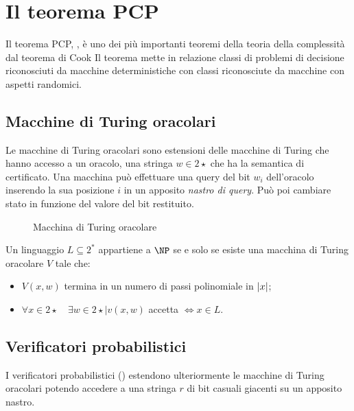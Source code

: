 


\section{Il teorema PCP}
Il teorema PCP, , è uno dei più importanti teoremi della teoria della complessità dal teorema di Cook
Il teorema mette in relazione classi di problemi di decisione riconosciuti da macchine deterministiche con classi riconosciute da macchine con aspetti randomici.


\subsection{Macchine di Turing oracolari}
Le macchine di Turing oracolari sono estensioni delle macchine di Turing che hanno accesso a un oracolo, una stringa $w\in 2\star$ che ha la semantica di certificato.
Una macchina può effettuare una query del bit $w_i$ dell'oracolo inserendo la sua posizione $i$ in un apposito \emph{nastro di query}.
Può poi cambiare stato in funzione del valore del bit restituito.

\begin{figure}[ht]
	\centering
	
	\caption{Macchina di Turing oracolare}
	\label{fig:mdtoracle}
\end{figure}

\begin{defin}
	Un linguaggio $L\subseteq 2^*$ appartiene a $\NP$ se e solo se esiste una macchina di Turing oracolare $V$ tale che:
	\begin{itemize}
		\item $V(x,w)$ termina in un numero di passi polinomiale in $|x|$;
		\item $\forall x\in 2\star \quad \exists w\in 2\star \mid v(x,w)$ accetta $\iff x\in L$.
	\end{itemize}
\end{defin}


\subsection{Verificatori probabilistici}
I verificatori probabilistici () estendono ulteriormente le macchine di Turing oracolari potendo accedere a una stringa $r$ di bit casuali giacenti su un apposito nastro.


